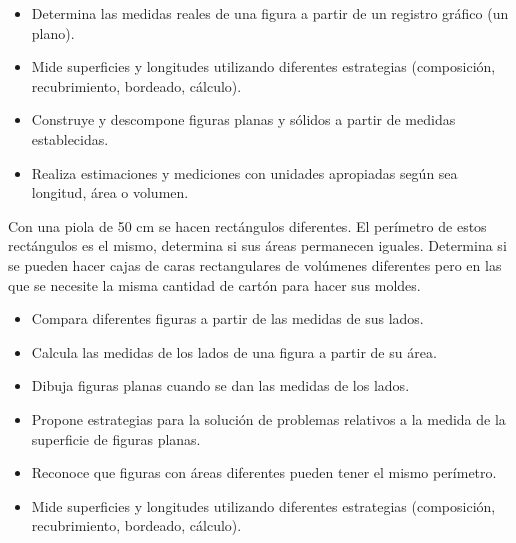 
\evidencias

\begin{itemize}
  \item Determina las medidas reales de una figura a partir de un registro gráfico (un plano).
  \item Mide superficies y longitudes utilizando diferentes estrategias (composición, recubrimiento, bordeado, cálculo).
  \item Construye y descompone figuras planas y sólidos a partir de medidas establecidas.
  \item Realiza estimaciones y mediciones con unidades apropiadas según sea longitud, área o volumen.
\end{itemize}

\ejemplo

Con una piola de 50 cm se hacen rectángulos diferentes. El perímetro de estos rectángulos es el mismo, determina si sus áreas permanecen iguales. Determina si se pueden hacer cajas de caras rectangulares de volúmenes diferentes pero en las que se necesite la misma cantidad de cartón para hacer sus moldes.



\evidencias

\begin{itemize}
  \item Compara diferentes figuras a partir de las medidas de sus lados.
  \item Calcula las medidas de los lados de una figura a partir de su área.
  \item Dibuja figuras planas cuando se dan las medidas de los lados.
  \item Propone estrategias para la solución de problemas relativos a la medida de la superficie de figuras planas.
  \item Reconoce que figuras con áreas diferentes pueden tener el mismo perímetro.
  \item Mide superficies y longitudes utilizando diferentes estrategias (composición, recubrimiento, bordeado, cálculo).
\end{itemize}

